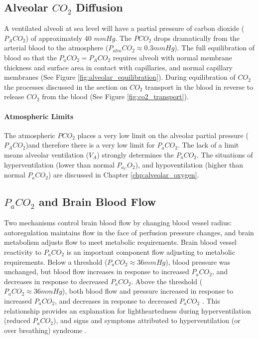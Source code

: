 \subsection{Alveolar $CO_2$ Diffusion}

A ventilated alveoli at sea level will have a partial pressure of carbon dioxide ($P_ACO_2$) of approximately 40 $mmHg$. The $PCO_2$ drops dramatically from the arterial blood to the atmosphere ($P_{atm}CO_2 \approx 0.3 mmHg$). The full equilibration of blood so that the $P_aCO_2 = P_ACO_2$ requires alveoli with normal membrane thickness and surface area in contact with capillaries, and normal capillary membranes (See Figure \ref{fig:alveolar_equilibration}). During equilibration of $CO_2$ the processes discussed in the section on $CO_2$ transport in the blood in reverse to release $CO_2$ from the blood (See Figure \ref{fig:co2_transport}). 

\paragraph{Atmospheric Limits}

The atmospheric $PCO_2$ places a very low limit on the alveolar partial pressure ($P_ACO_2$)and therefore there is a very low limit for $P_aCO_2$. The lack of a limit means alveolar ventilation ($V_A$) strongly determines the $P_aCO_2$. The situations of hyperventilation (lower than normal $P_a_CO_2$), and hypoventilation (higher than normal $P_aCO_2$) are discussed in Chapter \ref{chp:alveolar_oxygen}. 

\subsection{$P_aCO_2$ and Brain Blood Flow}

Two mechanisms control brain blood flow by changing blood vessel radius: autoregulation maintains flow in the face of perfusion pressure changes, and brain metabolism adjusts flow to meet metabolic requirements. Brain blood vessel reactivity to $P_aCO_2$ is an important component flow adjusting to metabolic requirements. Below a threshold ($P_aCO_2 \approx 36 mmHg$), blood pressure was unchanged, but blood flow increases in response to increased $P_aCO_2$, and decreases in response to decreased $P_aCO_2$. Above the threshold ($P_aCO_2 \approx 36 mmHg$), both blood flow and pressure increased in response to increased $P_aCO_2$, and decreases in response to decreased $P_aCO_2$ \cite{battisti-charbonney_cerebrovascular_2011}. This relationship provides an explanation for lightheartedness during hyperventilation (reduced $P_aCO_2$), and signs and symptoms attributed to hyperventilation (or over breathing) syndrome \cite{courtney_investigating_2008}.

